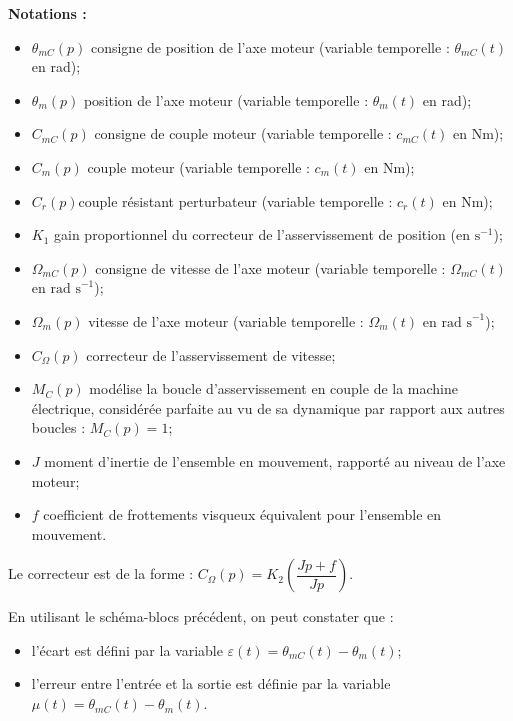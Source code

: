 \documentclass[10pt,fleqn]{article} %
\begin{document}
\begin{multicols}{2}
\textbf{Notations : }
\begin{itemize}
\item  $\theta_{mC}(p)$ consigne de position de l’axe moteur (variable temporelle : $\theta_{mC}(t)$ en rad);
\item  $\theta_{m}(p)$ position de l’axe moteur (variable temporelle : $\theta_{m}(t)$ en rad);
\item  $C_{mC}(p)$ consigne de couple moteur (variable temporelle : $c_{mC}(t)$ en Nm);
\item  $C_{m}(p)$ couple moteur (variable temporelle : $c_{m}(t)$ en Nm);
\item  $C_{r}(p)$couple résistant perturbateur (variable temporelle : $c_{r}(t)$ en Nm);
\item  $K_1$ gain proportionnel du correcteur de l’asservissement de position (en $\text{s}^{-1}$);
\item  $\Omega_{mC}(p)$ consigne de vitesse de l’axe moteur (variable temporelle : $\Omega_{mC}(t)$ en $\text{rad s}^{-1}$);
\item  $\Omega_{m}(p)$ vitesse de l’axe moteur (variable temporelle : $\Omega_{m}(t)$ en  $\text{rad s}^{-1}$);
\item  $C_{\Omega}(p)$ correcteur de l’asservissement de vitesse;
\item  $M_C(p)$ modélise la boucle d’asservissement en couple de la machine électrique, considérée parfaite au vu de sa dynamique par rapport aux autres boucles : $M_C(p)=1$; 
\item  $J$ moment d’inertie de l’ensemble en mouvement, rapporté au niveau de l’axe moteur;
\item  $f$ coefficient de frottements visqueux équivalent pour l’ensemble en mouvement.
\end{itemize}


Le correcteur est de la forme : $C_{\Omega}(p)=K_2 \left( \dfrac{Jp +f}{Jp}\right)$. 

En utilisant le schéma-blocs précédent, on peut constater que : 
\begin{itemize}
\item l'écart est défini par la variable $\varepsilon(t) = \theta_{mC}(t)-\theta_m(t)$;
\item l'erreur entre l’entrée et la sortie est définie par la variable $\mu(t)= \theta_{mC}(t)-\theta_m(t)$.
\end{itemize}


\end{multicols}
\end{document}
